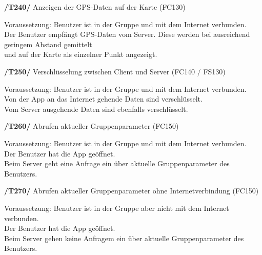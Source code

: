 \textbf{/T240/} Anzeigen der GPS-Daten auf der Karte (FC130)\\
\begin{center}
\vspace{-\parskip}
\begin{minipage}[t]{0.9\textwidth}
Voraussetzung: Benutzer ist in der Gruppe und mit dem Internet verbunden.                                     \\
Der Benutzer empfängt GPS-Daten vom Server. Diese werden bei ausreichend geringem Abstand gemittelt            \\
und auf der Karte als einzelner Punkt angezeigt.                                                                \\
\end{minipage}
\end{center}

\textbf{/T250/} Verschlüsselung zwischen Client und Server (FC140 / FS130)\\
\begin{center}
\vspace{-\parskip}
\begin{minipage}[t]{0.9\textwidth}
Voraussetzung: Benutzer ist in der Gruppe und mit dem Internet verbunden.            \\
Von der App an das Internet gehende Daten sind verschlüsselt.                         \\
Vom Server ausgehende Daten sind ebenfalls verschlüsselt.                              \\
\end{minipage}
\end{center}

\textbf{/T260/} Abrufen aktueller Gruppenparameter (FC150)\\
\begin{center}
\vspace{-\parskip}
\begin{minipage}[t]{0.9\textwidth}
Voraussetzung: Benutzer ist in der Gruppe und mit dem Internet verbunden.     \\
Der Benutzer hat die App geöffnet.                                             \\
Beim Server geht eine Anfrage ein über aktuelle Gruppenparameter des Benutzers. \\
\end{minipage}
\end{center}

\textbf{/T270/} Abrufen aktueller Gruppenparameter ohne Internetverbindung (FC150)\\
\begin{center}
\vspace{-\parskip}
\begin{minipage}[t]{0.9\textwidth}
Voraussetzung: Benutzer ist in der Gruppe aber nicht mit dem Internet verbunden. \\
Der Benutzer hat die App geöffnet.                                                \\
Beim Server gehen keine Anfragem ein über aktuelle Gruppenparameter des Benutzers. \\
\end{minipage}
\end{center}

